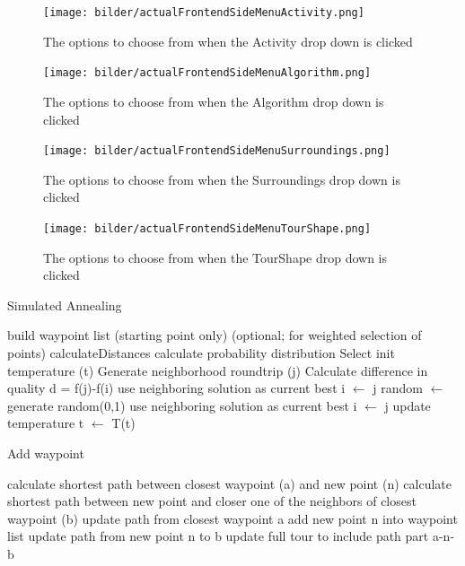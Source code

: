 \begin{figure}[H]
	\texttt{[image: bilder/actualFrontendSideMenuActivity.png]}
	\caption{The options to choose from when the Activity drop down is clicked}
	\label{fig:actualFrontendSideMenuActivity}
\end{figure}


\begin{figure}[H]
	\texttt{[image: bilder/actualFrontendSideMenuAlgorithm.png]}
	\caption{The options to choose from when the Algorithm drop down is clicked}
	\label{fig:actualFrontendSideMenuAlgorithm}
\end{figure}


\begin{figure}[H]
	\texttt{[image: bilder/actualFrontendSideMenuSurroundings.png]}
	\caption{The options to choose from when the Surroundings drop down is clicked}
	\label{fig:actualFrontendSideMenuSurroundings}
\end{figure}


\begin{figure}[H]
	\texttt{[image: bilder/actualFrontendSideMenuTourShape.png]}
	\caption{The options to choose from when the TourShape drop down is clicked}
	\label{fig:actualFrontendSideMenuTourShape}
\end{figure}




\begin{breakablealgorithm}
	\caption{Simulated Annealing}
	\label{alg:SAImplementation}
	\begin{algorithmic}[1]
		\STATE build waypoint list (starting point only)
		\STATE (optional; for weighted selection of points) calculateDistances
		\STATE calculate probability distribution
		\STATE Select init temperature (t)
		\STATE Generate neighborhood roundtrip (j)
		\STATE Calculate difference in quality d = f(j)-f(i)
		\STATE use neighboring solution as current best i $\gets$ j
		\ELSE 
		\STATE random $\gets$ generate random(0,1)
		\STATE use neighboring solution as current best i $\gets$ j
		\ENDIF
		\ENDIF
		\ENDFOR
		\STATE update temperature t $\gets$ T(t)
		\ENDFOR
	\end{algorithmic}
\end{breakablealgorithm}



\begin{breakablealgorithm}
	\caption{Add waypoint}
	\label{alg:SAGenerateNeigborhoodAdd}
	\begin{algorithmic}[1]
		\STATE calculate shortest path between closest waypoint (a) and new point (n)
		\STATE calculate shortest path between new point and closer one of the neighbors of closest waypoint (b)
		\STATE update path from closest waypoint a
		\STATE add new point n into waypoint list
		\STATE update path from new point n to b
		\STATE update full tour to include path part a-n-b
	\end{algorithmic}
\end{breakablealgorithm}

